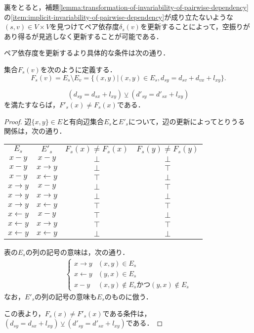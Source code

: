裏をとると，補題\ref{lemma:transformation-of-invariability-of-pairwise-dependency}の\ref{item:implicit-invariability-of-pairwise-dependency}が成り立たないような$(s,v)\in V\times V$を見つけてペア依存度$\delta_s(v)$を更新することによって，空振りがあり得るが見逃しなく更新することが可能である．

ペア依存度を更新するより具体的な条件は次の通り．
\begin{lemma}
  \label{lemma:condition-of-update-pairwise-dependency}
  集合$F_s(v)$を次のように定義する．
  \[ F_s(v)=E_s\setminus E_v=\{(x,y)|(x,y)\in E_s,d_{sy}=d_{sv}+d_{vx}+l_{xy}\}. \]

  \[ (d_{sy}=d_{sx}+l_{xy})\veebar(d'_{sy}=d'_{sx}+l_{xy}) \]
  を満たすならば，$F'_s(x)\neq F_s(x)$である．
\end{lemma}
\begin{proof}
  辺$\{x,y\}\in E$と有向辺集合$E_s$と$E'_s$について，辺の更新によってとりうる
  関係は，次の通り．

  \begin{center}
    \begin{tabular}{cccc}
      $E_s$ & $E'_s$ & $F_s(x)\neq F_s(x)$ & $F_s(y)\neq F_s(y)$ \\
      $x-y$ & $x-y$ & $\bot$ & $\bot$ \\
      $x-y$ & $x\rightarrow y$ & $\bot$ & $\top$ \\
      $x-y$ & $x\leftarrow y$ & $\top$ & $\bot$ \\
      $x\rightarrow y$ & $x-y$ & $\bot$ & $\top$ \\
      $x\rightarrow y$ & $x\rightarrow y$ & $\bot$ & $\bot$ \\
      $x\rightarrow y$ & $x\leftarrow y$ & $\top$ & $\top$ \\
      $x\leftarrow y$ & $x-y$ & $\top$ & $\bot$ \\
      $x\leftarrow y$ & $x\rightarrow y$ & $\top$ & $\top$ \\
      $x\leftarrow y$ & $x\leftarrow y$ & $\bot$ & $\bot$ \\
    \end{tabular}
  \end{center}

  表の$E_s$の列の記号の意味は，次の通り．
  \begin{align*}
    \begin{cases}
      x\rightarrow y & (x,y)\in E_s \\
      x\leftarrow y & (y,x)\in E_s \\
      x-y & (x,y)\notin E_s\text{かつ}(y,x)\notin E_s
    \end{cases}
  \end{align*}
  なお，$E'_s$の列の記号の意味も$E_s$のものに倣う．

  この表より，$F_s(x)\neq F'_s(x)$である条件は，$(d_{sy}=d_{sx}+l_{xy})\veebar(d'_{sy}=d'_{sx}+l_{xy})$である．
\end{proof}

